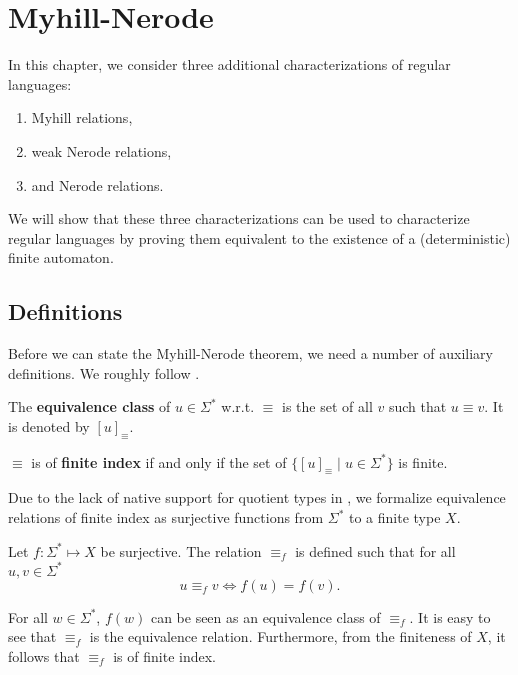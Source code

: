 
\chapter{Myhill-Nerode}
\label{chap:MN}

In this chapter, we consider three additional characterizations of regular languages:

\begin{enumerate}
    \item Myhill relations,
    \item weak Nerode relations,
    \item and Nerode relations.
\end{enumerate}


We will show that these three characterizations can be used to characterize regular languages 
by proving them equivalent to the existence of a (deterministic) finite automaton.


\section{Definitions}
Before we can state the Myhill-Nerode theorem, we need a number of auxiliary definitions. We roughly follow \cite{DBLP:books/daglib/0088160}.
\begin{definition}
    The \textbf{equivalence class} of $u \in \Sigma^*$ w.r.t. $\equiv$ is the set of all $v$ such that $u \equiv v$.
    It is denoted by $[u]_\equiv$.
\end{definition}

\begin{definition}
    $\equiv$ is of \textbf{finite index} if and only if the set of $\{[u]_\equiv \; | \; u \in \Sigma^* \}$ is finite.
\end{definition}


Due to the lack of native support for quotient types in \coq, 
we formalize equivalence relations of finite index 
as surjective functions from $\Sigma^*$ to a finite type $X$.

\begin{definition}
    \label{equiv_f}
    Let $f: \Sigma^* \mapsto X$ be surjective.
    The relation $\equiv_f$ is defined such that for all $u,v \in \Sigma^*$ 
    \begin{equation*}
        u \equiv_f v \iff f(u) = f(v).
    \end{equation*}
\end{definition}

For all $w \in \Sigma^*$, $f(w)$ can be seen as an equivalence class of $\equiv_f$.
It is easy to see that $\equiv_f$ is the equivalence relation. 
Furthermore, from the finiteness of $X$, it follows that $\equiv_f$ is of finite index.

